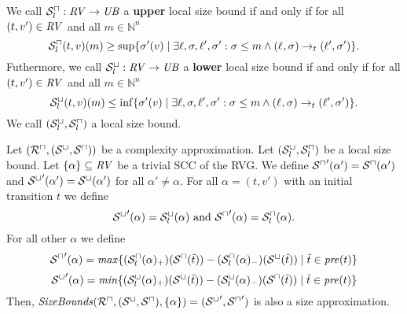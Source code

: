 \begin{definition}
  We call ${\mathcal{S}^\sqcap_l}: \mathit{RV} \rightarrow \mathit{UB}$ a \textbf{upper} local size bound if and only if for all $(t, v') \in \mathit{RV}$ and all $m \in \mathbb{N}^n$
  \[ {\mathcal{S}^\sqcap_l}(t, v)(m) \geq \sup \lbrace \sigma'(v) \mid \exists \ell, \sigma, \ell', \sigma': \sigma \leq m \wedge (\ell_{}, \sigma_{}) \rightarrow_t (\ell', \sigma') \rbrace. \]
  Futhermore, we call ${\mathcal{S}^\sqcup_l}: \mathit{RV} \rightarrow \mathit{UB}$ a \textbf{lower} local size bound if and only if for all $(t, v') \in \mathit{RV}$ and all $m \in \mathbb{N}^n$
  \[ {\mathcal{S}^\sqcup_l}(t, v)(m) \leq \inf \lbrace \sigma'(v) \mid \exists \ell, \sigma, \ell', \sigma': \sigma \leq m \wedge (\ell_{}, \sigma_{}) \rightarrow_t (\ell', \sigma') \rbrace. \]
  We call ${({\mathcal{S}^\sqcup_l}, {\mathcal{S}^\sqcap_l})}$ a local size bound.
\end{definition}

\begin{theorem}
  Let $({\mathcal{R}^\sqcap}, {({\mathcal{S}^\sqcup}, {\mathcal{S}^\sqcap})})$ be a complexity approximation.
  Let ${({\mathcal{S}^\sqcup_l}, {\mathcal{S}^\sqcap_l})}$ be a local size bound.
  Let $\lbrace \alpha \rbrace \subseteq \mathit{RV}$ be a trivial SCC of the RVG.
  We define ${\mathcal{S}^\sqcap}'(\alpha') = {\mathcal{S}^\sqcap}(\alpha')$ and ${\mathcal{S}^\sqcup}'(\alpha') = {\mathcal{S}^\sqcup}(\alpha')$ for all $\alpha' \neq \alpha$.
  For all $\alpha = (t, v')$ with an initial transition $t$ we define
  \[ {\mathcal{S}^\sqcup}'(\alpha) = {\mathcal{S}^\sqcup_l}(\alpha) \text{ and } {\mathcal{S}^\sqcap}'(\alpha) = {\mathcal{S}^\sqcap_l}(\alpha). \]
  For all other $\alpha$ we define 
  \[ {\mathcal{S}^\sqcap}'(\alpha) = \mathit{max} \lbrace  ({\mathcal{S}^\sqcap_l}(\alpha)_+)({\mathcal{S}^\sqcap}(\tilde{t})) - ({\mathcal{S}^\sqcap_l}(\alpha)_-)({\mathcal{S}^\sqcup}(\tilde{t})) \mid \tilde{t} \in \mathit{pre}(t) \rbrace \]
  \[ {\mathcal{S}^\sqcup}'(\alpha) = \mathit{min} \lbrace  ({\mathcal{S}^\sqcup_l}(\alpha)_+)({\mathcal{S}^\sqcup}(\tilde{t})) - ({\mathcal{S}^\sqcup_l}(\alpha)_-)({\mathcal{S}^\sqcap}(\tilde{t})) \mid \tilde{t} \in \mathit{pre}(t) \rbrace \]
  Then, $\mathit{SizeBounds}({\mathcal{R}^\sqcap}, {({\mathcal{S}^\sqcup}, {\mathcal{S}^\sqcap})}, \lbrace \alpha \rbrace) = ({\mathcal{S}^\sqcup}', {\mathcal{S}^\sqcap}')$ is also a size approximation.
\end{theorem}
